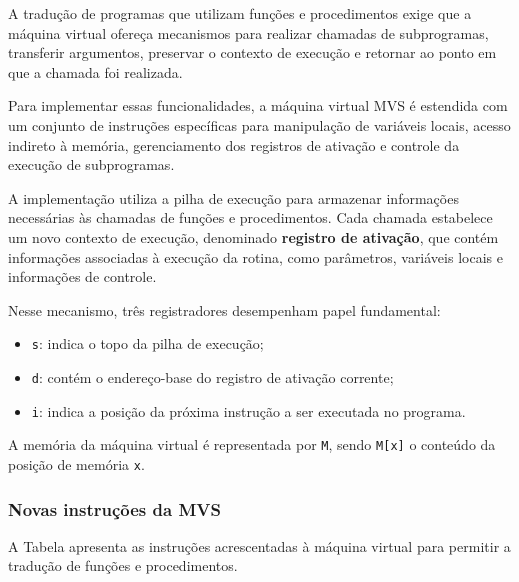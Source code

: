 \documentclass[
  brazilian,
  letterpaper,
]{book}
\providecommand{\tightlist}{%
  \setlength{\itemsep}{0pt}\setlength{\parskip}{0pt}}
\theoremstyle{plain}
\theoremstyle{definition}
\theoremstyle{remark}
\begin{document}
A tradução de programas que utilizam funções e procedimentos exige que a
máquina virtual ofereça mecanismos para realizar chamadas de
subprogramas, transferir argumentos, preservar o contexto de execução e
retornar ao ponto em que a chamada foi realizada.

Para implementar essas funcionalidades, a máquina virtual MVS é
estendida com um conjunto de instruções específicas para manipulação de
variáveis locais, acesso indireto à memória, gerenciamento dos registros
de ativação e controle da execução de subprogramas.

A implementação utiliza a pilha de execução para armazenar informações
necessárias às chamadas de funções e procedimentos. Cada chamada
estabelece um novo contexto de execução, denominado \textbf{registro de
ativação}, que contém informações associadas à execução da rotina, como
parâmetros, variáveis locais e informações de controle.

Nesse mecanismo, três registradores desempenham papel fundamental:

\begin{itemize}
\tightlist
\item
  \texttt{s}: indica o topo da pilha de execução;
\item
  \texttt{d}: contém o endereço-base do registro de ativação corrente;
\item
  \texttt{i}: indica a posição da próxima instrução a ser executada no
  programa.
\end{itemize}

A memória da máquina virtual é representada por \texttt{M}, sendo
\texttt{M{[}x{]}} o conteúdo da posição de memória \texttt{x}.

\subsubsection{Novas instruções da
MVS}\label{novas-instruuxe7uxf5es-da-mvs}

A Tabela apresenta as instruções acrescentadas à máquina virtual para
permitir a tradução de funções e procedimentos.
\end{document}
